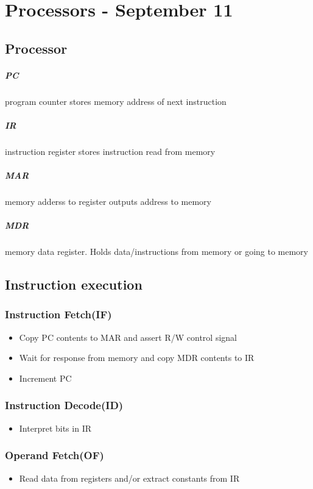 \chapter{Processors - September 11}
  \section{Processor}
    \paragraph{PC} program counter stores memory address of next instruction
    \paragraph{IR} instruction register stores instruction read from memory
    \paragraph{MAR} memory adderss to register outputs address to memory
    \paragraph{MDR} memory data register. Holds data/instructions from memory
    or going to memory
  \section{Instruction execution}
    \subsection{Instruction Fetch(IF)}
      \begin{itemize}
        \item Copy PC contents to MAR and assert R/W control signal
        \item Wait for response from memory and copy MDR contents to IR
        \item Increment PC
      \end{itemize}
    \subsection{Instruction Decode(ID)}
      \begin{itemize}
        \item Interpret bits in IR
      \end{itemize}
    \subsection{Operand Fetch(OF)}
      \begin{itemize}
        \item Read data from registers and/or extract constants from IR
      \end{itemize}
